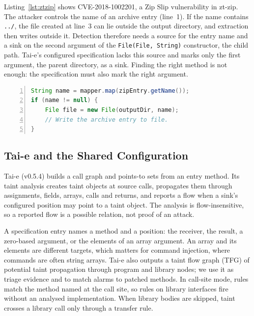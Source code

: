 \documentclass[sigconf]{acmart}
\begin{document}
Listing~\ref{lst:ztzip} shows \mbox{CVE-2018-1002201}, a Zip Slip vulnerability in zt-zip. The attacker controls the name of an archive entry (line~1). If the name contains \texttt{../}, the file created at line~3 can lie outside the output directory, and extraction then writes outside it. Detection therefore needs a source for the entry name and a sink on the second argument of the \texttt{File(File, String)} constructor, the child path. Tai-e's configured specification lacks this source and marks only the first argument, the parent directory, as a sink. Finding the right method is not enough: the specification must also mark the right argument.

\begin{lstlisting}[language=Java, numbers=left, numberstyle=\tiny\color{black!55}, numbersep=4pt, xleftmargin=9pt, caption={Zip Slip in zt-zip (abridged). The archive entry name (line~1) controls the child path; the output directory is a trusted input.}, label=lst:ztzip]
String name = mapper.map(zipEntry.getName());
if (name != null) {
    File file = new File(outputDir, name);
    // Write the archive entry to file.
}
\end{lstlisting}

\subsection{Tai-e and the Shared Configuration}
Tai-e (v0.5.4) builds a call graph and points-to sets from an entry method. Its taint analysis creates taint objects at source calls, propagates them through assignments, fields, arrays, calls and returns, and reports a flow when a sink's configured position may point to a taint object. The analysis is flow-insensitive, so a reported flow is a possible relation, not proof of an attack.

A specification entry names a method and a position: the receiver, the result, a zero-based argument, or the elements of an array argument. An array and its elements are different targets, which matters for command injection, where commands are often string arrays. Tai-e also outputs a taint flow graph (TFG) of potential taint propagation through program and library nodes; we use it as triage evidence and to match alarms to patched methods. In call-site mode, rules match the method named at the call site, so rules on library interfaces fire without an analysed implementation. When library bodies are skipped, taint crosses a library call only through a transfer rule.
\end{document}
